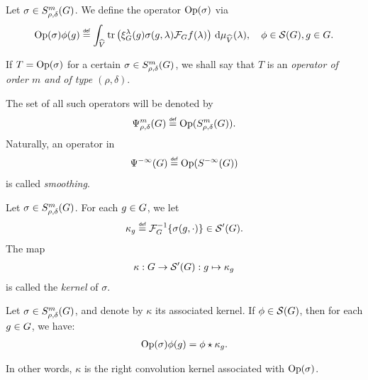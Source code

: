 \begin{definition}
\label{definition:operator_classes}
    Let $\sigma \in S^{m}_{\rho, \delta}(G)$.
    We define the operator $\operatorname{Op}(\sigma)$ via
    \begin{align*}
        \Op(\sigma) \phi(g) \defeq
        \int_\dualGroup\VectorSpace
            \tr\left(\Rep\lambda(g) \sigma(g, \lambda) \Fourier f(\lambda)\right)
        \dd \Plancherel{\VectorSpace}(\lambda),
        \quad \phi \in \Schwartz\Group, g \in \Group.
    \end{align*}

    If $T = \operatorname{Op}(\sigma)$ for a certain $\sigma \in S^{m}_{\rho, \delta}(G)$,
    we shall say that $T$ is an \emph{operator of order $m$ and of type $(\rho, \delta)$}.

    The set of all such operators will be denoted by
    \begin{align*}
        \OperatorClass{m}{\rho, \delta} \defeq \Op(\SymbolClass{m}{\rho, \delta}).
    \end{align*}
    Naturally, an operator in
    \begin{align*}
        \SmoothingOperators \defeq \Op(\SmoothingSymbols)
    \end{align*}
    is called \emph{smoothing}.
\end{definition}

\begin{definition}
\label{definition:kernel_of_symbol}
    Let $\sigma \in S^{m}_{\rho, \delta}(G)$.
    For each $g \in G$, we let
    \begin{align*}
        \kappa_g \defeq \InverseFourier\{\sigma(g, \dummy)\} \in \TemperedDistributions\Group.
    \end{align*}
    The map
    \begin{align*}
        \kappa : G \to {\mathcal{S}' (G)} : g \mapsto \kappa_g
    \end{align*}
    is called the \emph{kernel} of $\sigma$.
\end{definition}

\begin{proposition}[Quantisation]
    Let $\sigma \in S^{m}_{\rho, \delta}(G)$,
    and denote by $\kappa$ its associated kernel.
    If $\phi \in {\mathcal{S} (G)}$, then for each $g \in G$, we have:
    \begin{align*}
        \operatorname{Op}(\sigma) \phi(g) = \phi \star \kappa_g.
    \end{align*}

    In other words, $\kappa$ is the right convolution kernel associated with $\operatorname{Op}(\sigma)$.
\end{proposition}

